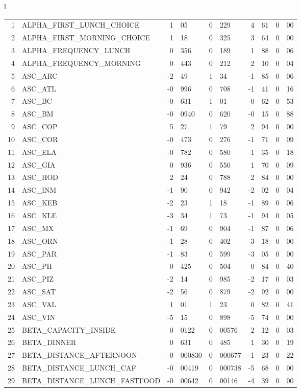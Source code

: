 \begin{tabular}{l}
\begin{tabular}{rlr@{.}lr@{.}lr@{.}lr@{.}l}
1 & ALPHA_FIRST_LUNCH_CHOICE & 1&05 & 0&229 & 4&61 & 0&00\\
2 & ALPHA_FIRST_MORNING_CHOICE & 1&18 & 0&325 & 3&64 & 0&00\\
3 & ALPHA_FREQUENCY_LUNCH & 0&356 & 0&189 & 1&88 & 0&06\\
4 & ALPHA_FREQUENCY_MORNING & 0&443 & 0&212 & 2&10 & 0&04\\
5 & ASC_ARC & -2&49 & 1&34 & -1&85 & 0&06\\
6 & ASC_ATL  & -0&996 & 0&708 & -1&41 & 0&16\\
7 & ASC_BC & -0&631 & 1&01 & -0&62 & 0&53\\
8 & ASC_BM  & -0&0940 & 0&620 & -0&15 & 0&88\\
9 & ASC_COP & 5&27 & 1&79 & 2&94 & 0&00\\
10 & ASC_COR  & -0&473 & 0&276 & -1&71 & 0&09\\
11 & ASC_ELA  & -0&782 & 0&580 & -1&35 & 0&18\\
12 & ASC_GIA  & 0&936 & 0&550 & 1&70 & 0&09\\
13 & ASC_HOD  & 2&24 & 0&788 & 2&84 & 0&00\\
14 & ASC_INM  & -1&90 & 0&942 & -2&02 & 0&04\\
15 & ASC_KEB  & -2&23 & 1&18 & -1&89 & 0&06\\
16 & ASC_KLE & -3&34 & 1&73 & -1&94 & 0&05\\
17 & ASC_MX  & -1&69 & 0&904 & -1&87 & 0&06\\
18 & ASC_ORN  & -1&28 & 0&402 & -3&18 & 0&00\\
19 & ASC_PAR  & -1&83 & 0&599 & -3&05 & 0&00\\
20 & ASC_PH  & 0&425 & 0&504 & 0&84 & 0&40\\
21 & ASC_PIZ  & -2&14 & 0&985 & -2&17 & 0&03\\
22 & ASC_SAT  & -2&56 & 0&879 & -2&92 & 0&00\\
23 & ASC_VAL  & 1&01 & 1&23 & 0&82 & 0&41\\
24 & ASC_VIN & -5&15 & 0&898 & -5&74 & 0&00\\
25 & BETA_CAPACITY_INSIDE & 0&0122 & 0&00576 & 2&12 & 0&03\\
26 & BETA_DINNER & 0&631 & 0&485 & 1&30 & 0&19\\
27 & BETA_DISTANCE_AFTERNOON & -0&000830 & 0&000677 & -1&23 & 0&22\\
28 & BETA_DISTANCE_LUNCH_CAF & -0&00419 & 0&000738 & -5&68 & 0&00\\
29 & BETA_DISTANCE_LUNCH_FASTFOOD & -0&00642 & 0&00146 & -4&39 & 0&00\\

\end{tabular}
\end{tabular}
